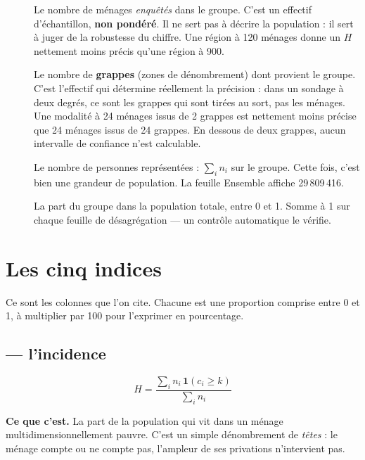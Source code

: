 \documentclass[11pt,a4paper]{article}
\begin{document}
\begin{description}
  \item[] Le nombre de ménages \emph{enquêtés} dans le groupe. C'est un effectif
  d'échantillon, \textbf{non pondéré}. Il ne sert pas à décrire la population : il sert à juger de
  la robustesse du chiffre. Une région à 120 ménages donne un $H$ nettement moins précis qu'une
  région à 900.

  \item[] Le nombre de \textbf{grappes} (zones de dénombrement) dont provient le
  groupe. C'est l'effectif qui détermine réellement la précision : dans un sondage à deux degrés,
  ce sont les grappes qui sont tirées au sort, pas les ménages. Une modalité à 24 ménages issus de
  2 grappes est nettement moins précise que 24 ménages issus de 24 grappes. En dessous de deux
  grappes, aucun intervalle de confiance n'est calculable.

  \item[] Le nombre de personnes représentées : $\sum_i n_i$ sur le groupe. Cette
  fois, c'est bien une grandeur de population. La feuille \textsf{Ensemble} affiche 29\,809\,416.

  \item[] La part du groupe dans la population totale, entre 0 et 1. Somme à
  1 sur chaque feuille de désagrégation --- un contrôle automatique le vérifie.
\end{description}

\section{Les cinq indices}

Ce sont les colonnes que l'on cite. Chacune est une proportion comprise entre 0 et 1, à multiplier
par 100 pour l'exprimer en pourcentage.

\subsection*{ --- l'incidence}

\[
H = \frac{\sum_i n_i \, \mathbf{1}(c_i \ge k)}{\sum_i n_i}
\]

\textbf{Ce que c'est.} La part de la population qui vit dans un ménage
multidimensionnellement pauvre. C'est un simple dénombrement de \emph{têtes} : le ménage compte ou
ne compte pas, l'ampleur de ses privations n'intervient pas.
\end{document}
